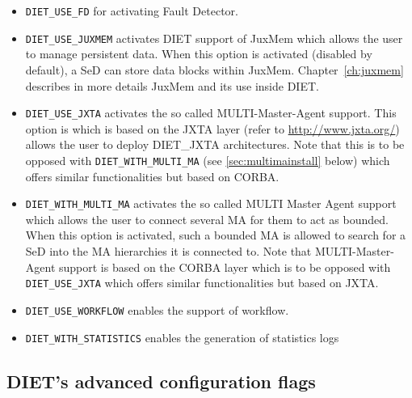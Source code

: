 \begin{itemize}
\item
  \verb+DIET_USE_FD+ for activating Fault Detector.

\item 
  \verb+DIET_USE_JUXMEM+ activates DIET support of JuxMem which allows
  the user to manage persistent data.
  When this option is activated (disabled by default), a SeD can store
  data blocks within JuxMem.
  Chapter~\ref{ch:juxmem} describes in more details JuxMem and its use
  inside DIET.

\item
  \verb+DIET_USE_JXTA+ activates the so called MULTI-Master-Agent
  support.
  This option is which is based on the JXTA layer (refer to
  \url{http://www.jxta.org/}) allows the user to deploy DIET\_JXTA
  architectures.
  Note that this is to be opposed with
  \verb+DIET_WITH_MULTI_MA+ (see \ref{sec:multimainstall} below)
  which offers similar functionalities but based on CORBA.

\item
  \label{sec:multimainstall}
  \verb+DIET_WITH_MULTI_MA+ activates the so called MULTI Master Agent
  support which allows the user to connect several MA for them to
  act as bounded.
  When this option is activated, such a bounded MA is allowed to search
  for a SeD into the MA hierarchies it is connected to.
  Note that MULTI-Master-Agent support is based on the CORBA layer
  which is to be opposed with \verb+DIET_USE_JXTA+ which offers similar
  functionalities but based on JXTA.

\item
  \verb+DIET_USE_WORKFLOW+ enables the support of workflow.

\item
  \verb+DIET_WITH_STATISTICS+ enables the generation of statistics logs
\end{itemize}

\subsection{DIET's advanced configuration flags}
\noindent

